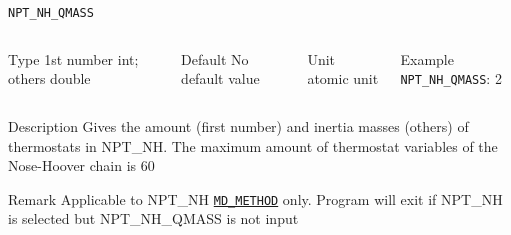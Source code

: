 \begin{frame}[allowframebreaks]{\texttt{NPT\_NH\_QMASS}} \label{NPT_NH_QMASS}
\vspace*{-12pt}
\begin{columns}
\begin{block}{Type}
1st number int; others double
\end{block}

\begin{block}{Default}
No default value
\end{block}

\begin{block}{Unit}
atomic unit
\end{block}

\begin{block}{Example}
\texttt{NPT\_NH\_QMASS}: 2
\end{block}
\end{columns}

\begin{block}{Description}
Gives the amount (first number) and inertia masses (others) of thermostats in NPT\_NH. The maximum amount of thermostat variables of the Nose-Hoover chain is 60
\end{block}

\begin{block}{Remark}
Applicable to NPT\_NH \hyperlink{MD_METHOD}{\texttt{MD\_METHOD}} only.
Program will exit if NPT\_NH is selected but NPT\_NH\_QMASS is not input
\end{block}

\end{frame}



